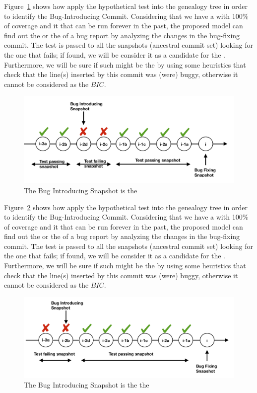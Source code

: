 \documentclass[a4paper, 12pt]{book}
\begin{document}
Figure~\ref{fig:snapshot1} shows how apply the hypothetical test into the genealogy tree in order to identify the Bug-Introducing Commit. Considering that we have a \TSB with 100\% of coverage and it that can be run forever in the past, the proposed model can find out the \BIC or the \FFC of a bug report by analyzing the changes in the bug-fixing commit. The \TSB test is passed to all the snapshots (ancestral commit set) looking for the one that fails; if found, we will be consider it as a candidate for the \BIC. Furthermore, we will be sure if such \FFC might be the \BIC by using some heuristics that check that the line(s) inserted by this commit was (were) buggy, otherwise it cannot be considered as the $BIC$.

\begin{figure}[ht]
\centering
\includegraphics[width=\columnwidth]{img/snapshot1.png}
\caption{The Bug Introducing Snapshot is the \BIC}
\label{fig:snapshot1}       %
\end{figure}

Figure~\ref{fig:snapshot2} shows how apply the hypothetical test into the genealogy tree in order to identify the Bug-Introducing Commit. Considering that we have a \TSB with 100\% of coverage and it that can be run forever in the past, the proposed model can find out the \BIC or the \FFC of a bug report by analyzing the changes in the bug-fixing commit. The \TSB test is passed to all the snapshots (ancestral commit set) looking for the one that fails; if found, we will be consider it as a candidate for the \BIC. Furthermore, we will be sure if such \FFC might be the \BIC by using some heuristics that check that the line(s) inserted by this commit was (were) buggy, otherwise it cannot be considered as the $BIC$.

\begin{figure}[ht]
\centering
\includegraphics[width=\columnwidth]{img/snapshot2.png}
\caption{The Bug Introducing Snapshot is the the \FFC }
\label{fig:snapshot2}       %
\end{figure}
\end{document}
